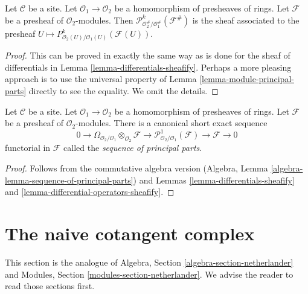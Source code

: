 \begin{lemma}
\label{lemma-differential-operators-sheafify}
Let $\mathcal{C}$ be a site. Let $\mathcal{O}_1 \to \mathcal{O}_2$
be a homomorphism of presheaves of rings. Let $\mathcal{F}$ be a presheaf
of $\mathcal{O}_2$-modules. Then
$\mathcal{P}^k_{\mathcal{O}_2^\#/\mathcal{O}_1^\#}(\mathcal{F}^\#)$
is the sheaf associated to the presheaf
$U \mapsto P^k_{\mathcal{O}_2(U)/\mathcal{O}_1(U)}(\mathcal{F}(U))$.
\end{lemma}

\begin{proof}
This can be proved in exactly the same way as is done for the sheaf
of differentials in Lemma \ref{lemma-differentials-sheafify}.
Perhaps a more pleasing approach is to use the universal property
of Lemma \ref{lemma-module-principal-parts} directly to see the equality.
We omit the details.
\end{proof}

\begin{lemma}
\label{lemma-sequence-of-principal-parts}
Let $\mathcal{C}$ be a site. Let $\mathcal{O}_1 \to \mathcal{O}_2$
be a homomorphism of presheaves of rings. Let $\mathcal{F}$ be a presheaf
of $\mathcal{O}_2$-modules. There is a
canonical short exact sequence
$$
0 \to
\Omega_{\mathcal{O}_2/\mathcal{O}_1} \otimes_{\mathcal{O}_2} \mathcal{F} \to
\mathcal{P}^1_{\mathcal{O}_2/\mathcal{O}_1}(\mathcal{F}) \to
\mathcal{F} \to 0
$$
functorial in $\mathcal{F}$ called the {\it sequence of principal parts}.
\end{lemma}

\begin{proof}
Follows from the commutative algebra version
(Algebra, Lemma \ref{algebra-lemma-sequence-of-principal-parts})
and Lemmas \ref{lemma-differentials-sheafify} and
\ref{lemma-differential-operators-sheafify}.
\end{proof}








\section{The naive cotangent complex}
\label{section-netherlander}

\noindent
This section is the analogue of
Algebra, Section \ref{algebra-section-netherlander}
and
Modules, Section \ref{modules-section-netherlander}.
We advise the reader to read those sections first.


